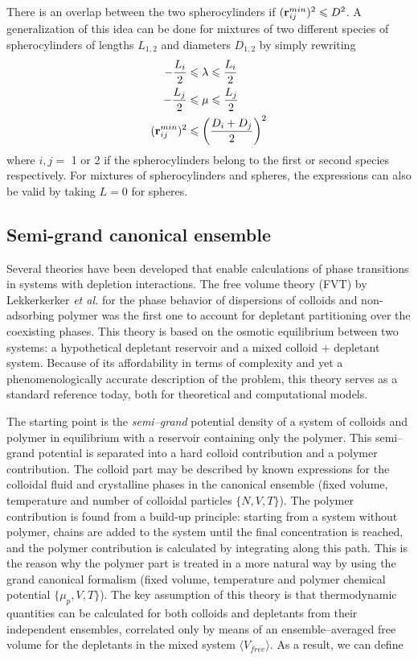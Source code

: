 There is an overlap between the two spherocylinders if $({\bf r}_{ij}^{min})^2 \leqslant D^2$. A generalization of this idea can be done for mixtures of two different species of spherocylinders of lengths $L_{1,2}$ and diameters $D_{1,2}$ by simply rewriting
\begin{align}
-\frac{L_i}{2}& \leqslant \lambda \leqslant \frac{L_i}{2} \nonumber \\
-\frac{L_j}{2}& \leqslant \mu \leqslant \frac{L_j}{2} \nonumber \\
    ({\bf r}_{ij}^{min})^2& \leqslant \left( \frac{D_i+D_j}{2}\right)^2
\end{align}
where $i,j=$ 1 or 2 if the spherocylinders belong to the first or second species respectively. For mixtures of spherocylinders and spheres, the expressions can also be valid by taking $L=0$ for spheres.

\subsection{Semi-grand canonical ensemble}

Several theories have been developed that enable calculations of phase transitions in systems with depletion interactions. The free volume theory (FVT) by Lekkerkerker {\em et al.} \cite{sphere+polymer} for the phase behavior of dispersions of colloids and non-adsorbing polymer was the first one to account for depletant partitioning over the coexisting phases. This theory is based on the osmotic equilibrium between two systems: a hypothetical depletant reservoir and a mixed colloid $+$ depletant system. Because of its affordability in terms of complexity and yet a phenomenologically accurate description of the problem, this theory serves as a standard reference today, both for theoretical and computational models.

The starting point is the {\em semi--grand} potential density of a system of colloids and polymer in equilibrium with a reservoir containing only the polymer. This semi--grand potential is separated into a hard colloid contribution and a polymer contribution. The colloid part may be described by known expressions for the colloidal fluid and crystalline phases in the canonical ensemble (fixed volume, temperature and number of colloidal particles $\{N,V,T\}$). The polymer contribution is found from a build-up principle: starting from a system without polymer, chains are added to the system until the final concentration is reached, and the polymer contribution is calculated by integrating along this path. This is the reason why the polymer part is treated in a more natural way by using the grand canonical formalism (fixed volume, temperature and polymer chemical potential $\{\mu_p,V,T\}$). The key assumption of this theory is that thermodynamic quantities can be calculated for both colloids and depletants from their independent ensembles, correlated only by means of an ensemble--averaged free volume for the depletants in the mixed system $\langle V_{free} \rangle$. As a result, we can define

